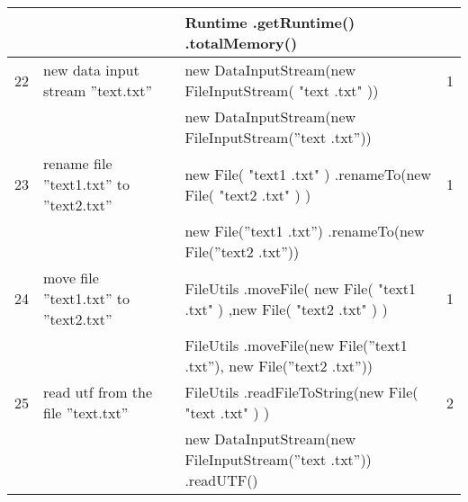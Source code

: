\begin{longtable}{|p{}|p{}|p{}|p{}|}
		\rowcolor[HTML]{9AFF99} 
		&                                                        & Runtime .getRuntime() .totalMemory()                                                                             &                                         \\ \hline
		\rowcolor[HTML]{FFCCC9} 
		22                                & new data input stream ”text.txt”                       & new DataInputStream(new FileInputStream( "text .txt" ))                                                          & 1                                       \\ \hline
		\rowcolor[HTML]{9AFF99} 
		&                                                        & new DataInputStream(new FileInputStream(”text .txt”))                                                            &                                         \\ \hline
		\rowcolor[HTML]{FFCCC9} 
		23                                & rename file ”text1.txt” to ”text2.txt”                 & new File( "text1 .txt" )  .renameTo(new File( "text2 .txt" ) )                                                   & 1                                       \\ \hline
		\rowcolor[HTML]{9AFF99} 
		&                                                        & new File(”text1 .txt”) .renameTo(new File(”text2 .txt”))                                                         &                                         \\ \hline
		\rowcolor[HTML]{FFCCC9} 
		24                                & move file ”text1.txt” to ”text2.txt”                   & FileUtils .moveFile( new File( "text1 .txt" ) ,new File( "text2 .txt" ) )                                        & 1                                       \\ \hline
		\rowcolor[HTML]{9AFF99} 
		&                                                        & FileUtils .moveFile(new File(”text1 .txt”), new File(”text2 .txt”))                                              &                                         \\ \hline
		\rowcolor[HTML]{FFCCC9} 
		25                                & read utf from the file ”text.txt”                      & FileUtils .readFileToString(new File( "text .txt" ) )                                                            & 2                                       \\ \hline
		\rowcolor[HTML]{9AFF99} 
		&                                                        & new DataInputStream(new FileInputStream(”text .txt”)) .readUTF()                                                 &                                         \\ \hline

\end{longtable}
